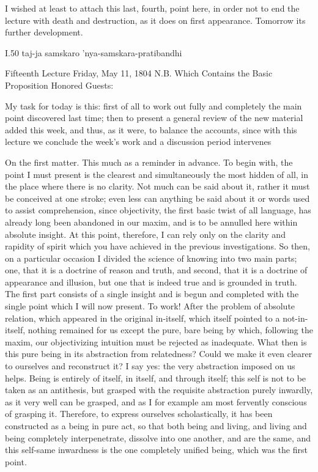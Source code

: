 I wished at least to attach this last, fourth, point here,
in order not to end the lecture with death and destruction,
as it does on first appearance.
Tomorrow its further development.

I.50
taj-ja samskaro 'nya-samskara-pratibandhi

Fifteenth Lecture
Friday, May 11, 1804
N.B. Which Contains the Basic Proposition
Honored Guests:

My task for today is this:
first of all to work out fully and completely
the main point discovered last time;
then to present a general review of
the new material added this week,
and thus, as it were, to balance the accounts,
since with this lecture we conclude the week's work
and a discussion period intervenes

On the first matter.
This much as a reminder in advance.
To begin with, the point I must present is
the clearest and simultaneously the most hidden of all,
in the place where there is no clarity.
Not much can be said about it,
rather it must be conceived at one stroke;
even less can anything be said about it
or words used to assist comprehension,
since objectivity, the first basic twist of all language,
has already long been abandoned in our maxim,
and is to be annulled here within absolute insight.
At this point, therefore, I can rely only
on the clarity and rapidity of spirit
which you have achieved in the previous investigations.
So then, on a particular occasion I divided
the science of knowing into two main parts;
one, that it is a doctrine of reason and truth,
and second, that it is a doctrine of appearance and illusion,
but one that is indeed true and is grounded in truth.
The first part consists of a single insight and is begun
and completed with the single point which I will now present.
To work!
After the problem of absolute relation,
which appeared in the original in-itself,
which itself pointed to a not-in-itself,
nothing remained for us except
the pure, bare being by which, following the maxim,
our objectivizing intuition must be rejected as inadequate.
What then is this pure being in its abstraction from relatedness?
Could we make it even clearer to ourselves and reconstruct it?
I say yes: the very abstraction imposed on us helps.
Being is entirely of itself, in itself, and through itself;
this self is not to be taken as an antithesis,
but grasped with the requisite abstraction purely inwardly,
as it very well can be grasped,
and as I for example am most fervently conscious of grasping it.
Therefore, to express ourselves scholastically,
it has been constructed as a being in pure act,
so that both being and living, and living and being
completely interpenetrate, dissolve into one another,
and are the same, and this self-same inwardness is
the one completely unified being,
which was the first point.

